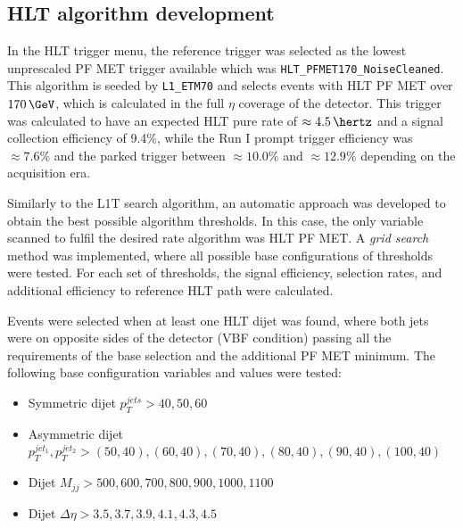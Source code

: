 \subsection{HLT algorithm development}
\label{SECTION:RunIITriggerStudies_HLTAlgorithmDevelopment}


In the \gls{HLT} trigger menu, the reference trigger was selected as the lowest unprescaled \gls{PF} \gls{MET} trigger available which was \verb|HLT_PFMET170_NoiseCleaned|. This algorithm is seeded by \verb|L1_ETM70| and selects events with \gls{HLT} \gls{PF} \gls{MET} over $170\,\GeV$, which is calculated in the full $\eta$ coverage of the detector. This trigger was calculated to have an expected \gls{HLT} pure rate of $\approx 4.5\,\hertz$ and a signal collection efficiency of 9.4\%, while the Run I prompt trigger efficiency was $\approx 7.6\%$ and the parked trigger between $\approx 10.0\%$ and $\approx 12.9\%$ depending on the acquisition era. 

Similarly to the \gls{L1T} search algorithm, an automatic approach was developed to obtain the best possible algorithm thresholds. In this case, the only variable scanned to fulfil the desired rate algorithm was \gls{HLT} \gls{PF} \gls{MET}. A \textit{grid search} method was implemented, where all possible base configurations of thresholds were tested. For each set of thresholds, the signal efficiency, selection rates, and additional efficiency to reference \gls{HLT} path were calculated. 

Events were selected when at least one \gls{HLT} dijet was found, where both jets were on opposite sides of the detector (\gls{VBF} condition) passing all the requirements of the base selection and the additional \gls{PF} \gls{MET} minimum. The following base configuration variables and values were tested:

\begin{itemize}
  \item Symmetric dijet $p_T^{jets}>{40,50,60}$
  \item Asymmetric dijet $p_T^{jet_1},p_T^{jet_2}>{(50,40),(60,40),(70,40),(80,40),(90,40),(100,40)}$
  \item Dijet $M_{jj}>{500,600,700,800,900,1000,1100}$
  \item Dijet $\Delta\eta>{3.5,3.7,3.9,4.1,4.3,4.5}$
\end{itemize}

